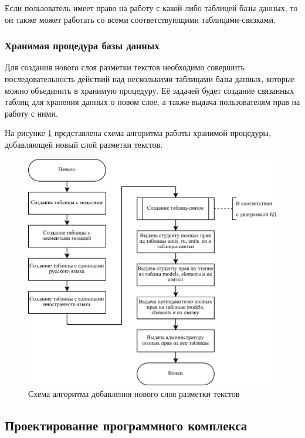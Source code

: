 \clearpage

Если пользователь имеет право на работу с какой-либо таблицей базы данных, то он также может работать со всеми соответствующими таблицами-связками.

\subsubsection{Хранимая процедура базы данных}

Для создания нового слоя разметки текстов необходимо совершить последовательность действий над несколькими таблицами базы данных, которые можно объединить в хранимую процедуру. Её задачей будет создание связанных таблиц для хранения данных о новом слое, а также выдача пользователям прав на работу с ними.

На рисунке \ref{fig:proc_alg} представлена схема алгоритма работы хранимой процедуры, добавляющей новый слой разметки текстов.

\begin{figure}[h]
	\centering
	\includegraphics[width=\textwidth ]{img/procedure_algorithm/procedure_algorithm.drawio.png}
	\caption{Схема алгоритма добавления нового слоя разметки текстов}
	\label{fig:proc_alg}
\end{figure} 

\clearpage



\subsection{Проектирование программного комплекса}

